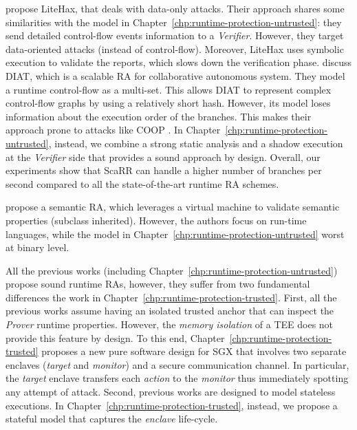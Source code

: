 \cite{Dessouky:2018:LLH:3240765.3240821} propose LiteHax, that deals with 
data-only attacks.
Their approach shares some similarities with the model in 
Chapter~\ref{chp:runtime-protection-untrusted}: they 
send detailed control-flow events information to a \emph{Verifier}. 
However, they target data-oriented attacks (instead of control-flow). Moreover, 
LiteHax uses symbolic execution to validate the reports, which slows down the 
verification phase.
\cite{aberadiat} discuss DIAT, which is a scalable RA for collaborative 
autonomous system. They model a runtime control-flow as a multi-set. This 
allows DIAT to represent complex control-flow graphs by using a relatively 
short hash. However, its model loses information about the execution order of 
the branches. This makes their approach prone to attacks like 
COOP \citep{schuster2015counterfeit}. 
In Chapter~\ref{chp:runtime-protection-untrusted}, instead, we combine a strong 
static analysis and a shadow execution at the \emph{Verifier} side that 
provides a sound approach by design. Overall, our 
experiments show that ScaRR can handle a higher number of branches per second 
compared to all the state-of-the-art runtime RA schemes.

\cite{haldar2004semantic} propose a semantic RA, which leverages 
a virtual machine to validate semantic properties (\eg subclass inherited). 
However, the authors focus on run-time languages, while the model in 
Chapter~\ref{chp:runtime-protection-untrusted} worst at binary 
level.

All the previous works (including 
Chapter~\ref{chp:runtime-protection-untrusted}) propose sound runtime RAs, 
however, they suffer from two fundamental differences \wrt the work in 
Chapter~\ref{chp:runtime-protection-trusted}.
First, all the previous works assume having an isolated trusted anchor that can 
inspect the \emph{Prover} runtime properties.
However, the \emph{memory isolation} of a TEE does not provide this feature by 
design.
To this end, Chapter~\ref{chp:runtime-protection-trusted} proposes a new pure 
software design for SGX that involves two separate enclaves (\ie \emph{target} 
and \emph{monitor}) and a secure communication channel.
In particular, the \emph{target} enclave transfers each \emph{action} to the 
\emph{monitor} thus immediately spotting any attempt of attack.
Second, previous works are designed to model stateless executions.
In Chapter~\ref{chp:runtime-protection-trusted}, instead, we propose a stateful 
model that captures the \emph{enclave} life-cycle.

